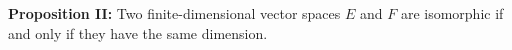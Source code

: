 \textbf{Proposition II:} Two finite-dimensional vector spaces $E$ and $F$ are isomorphic if and only if they have the same dimension.

